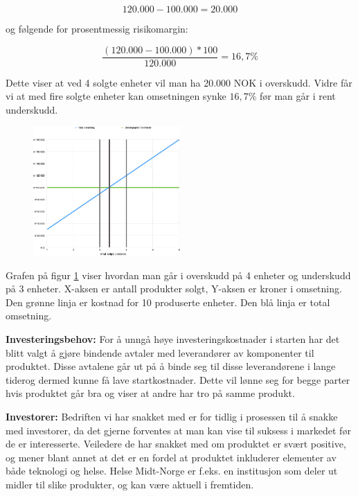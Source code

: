 $$ 120.000 - 100.000 = 20.000$$

og følgende for prosentmessig risikomargin:

$$ \frac{(120.000 - 100.000) * 100}{120.000} = 16,7 \% $$

Dette viser at ved 4 solgte enheter vil man ha 20.000 NOK i overskudd. Vidre får vi at med fire solgte enheter kan omsetningen synke $16,7 \%$ før man går i rent underskudd.

\begin{figure}[ht!]
    \begin{center}
    \includegraphics[width=0.5\textwidth]{graph.png}
    \label{fig:profitmargin}
    \end{center}
\end{figure}

Grafen på figur \ref{fig:profitmargin} viser hvordan man går i overskudd på 4 enheter og underskudd på 3 enheter. X-aksen er antall produkter solgt, Y-aksen er kroner i omsetning. Den grønne linja er kostnad for 10 produserte enheter. Den blå linja er total omsetning.

\textbf{Investeringsbehov:}
For å unngå høye investeringskostnader i starten har det blitt valgt å gjøre bindende avtaler med leverandører av komponenter til produktet. Disse avtalene går ut på å binde seg til disse leverandørene i lange tiderog dermed kunne få lave startkostnader. Dette vil lønne seg for begge parter hvis produktet går bra og viser at andre har tro på samme produkt.

\textbf{Investorer:}
Bedriften vi har snakket med er for tidlig i prosessen til å snakke med investorer, da det gjerne forventes at man kan vise til suksess i markedet før de er interesserte.
Veiledere de har snakket med om produktet er svært positive, og mener blant annet at det er en fordel at produktet inkluderer elementer av både teknologi og helse. Helse Midt-Norge er f.eks. en institusjon som deler ut midler til slike produkter, og kan være aktuell i fremtiden.
